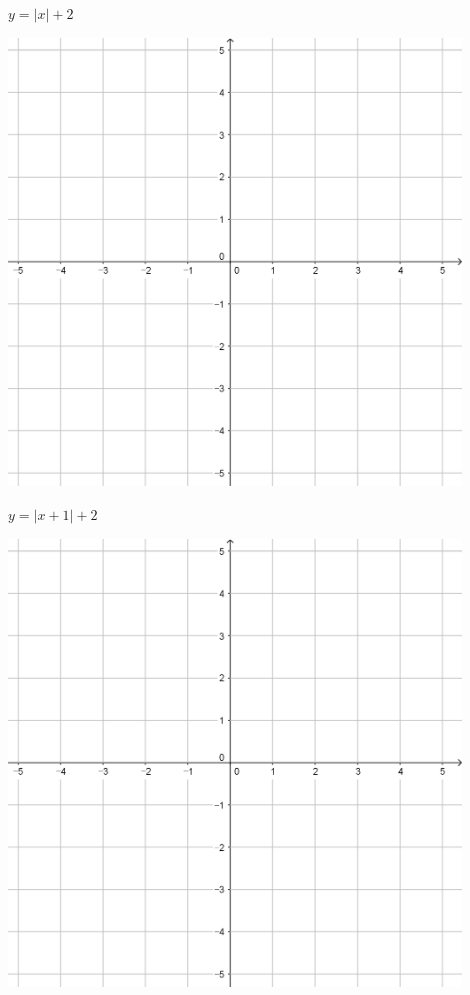 \documentclass[a4paper]{oblivoir}
\begin{document}
\begin{minipage}{0.45\textwidth}\centering
\(y=|x|+2\)
\par\bigskip\includegraphics[width=0.9\textwidth]{55}
\end{minipage}
\begin{minipage}{0.45\textwidth}\centering
\(y=|x+1|+2\)
\par\bigskip\includegraphics[width=0.9\textwidth]{55}
\end{minipage}\bigskip\bigskip\par
\end{document}
